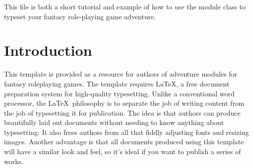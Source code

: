 \documentclass[a4paper,serif]{module}       %
\begin{document}


\maketitle







\showtitle

This file is both a short tutorial and example of how to use the module class to typeset your fantasy role-playing game adventure.

\part{Introduction}

This template is provided as a resource for authors of adventure modules for fantasy roleplaying games.
The template requires \LaTeX, a free document preparation system for high-quality typesetting. Unlike a conventional
word processor, the \LaTeX~philosophy is to separate the job of writing content from the job of typesetting it for
publication. The idea is that authors can produce beautifully laid out documents without needing to know anything
about typesetting. It also frees authors from all that fiddly adjusting fonts and resizing images. Another advantage
is that all documents produced using this template will have a similar look and feel, so it's ideal if you want to
publish a series of works.
\end{document}
